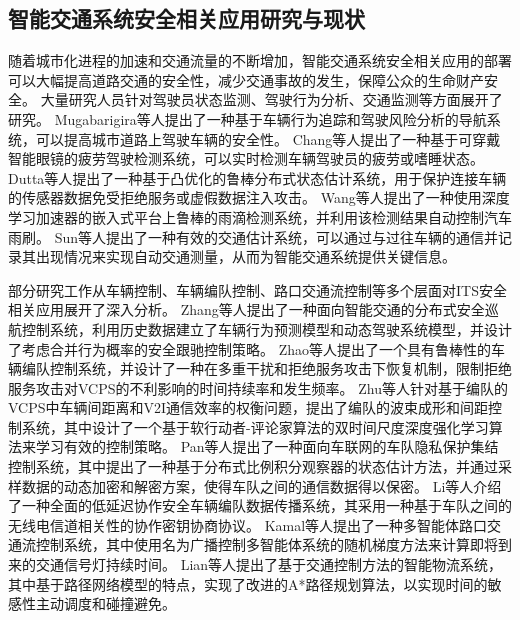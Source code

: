 \subsection{智能交通系统安全相关应用研究与现状}

随着城市化进程的加速和交通流量的不断增加，智能交通系统安全相关应用的部署可以大幅提高道路交通的安全性，减少交通事故的发生，保障公众的生命财产安全。
大量研究人员针对驾驶员状态监测、驾驶行为分析、交通监测等方面展开了研究。
Mugabarigira等人\cite{mugabarigira2023context}提出了一种基于车辆行为追踪和驾驶风险分析的导航系统，可以提高城市道路上驾驶车辆的安全性。
Chang等人\cite{chang2018design}提出了一种基于可穿戴智能眼镜的疲劳驾驶检测系统，可以实时检测车辆驾驶员的疲劳或嗜睡状态。
Dutta等人\cite{dutta2022design}提出了一种基于凸优化的鲁棒分布式状态估计系统，用于保护连接车辆的传感器数据免受拒绝服务或虚假数据注入攻击。
Wang等人\cite{wang2021deep}提出了一种使用深度学习加速器的嵌入式平台上鲁棒的雨滴检测系统，并利用该检测结果自动控制汽车雨刷。
Sun等人\cite{sun2022toward}提出了一种有效的交通估计系统，可以通过与过往车辆的通信并记录其出现情况来实现自动交通测量，从而为智能交通系统提供关键信息。

部分研究工作从车辆控制、车辆编队控制、路口交通流控制等多个层面对ITS安全相关应用展开了深入分析。
Zhang等人\cite{zhang2021data}提出了一种面向智能交通的分布式安全巡航控制系统，利用历史数据建立了车辆行为预测模型和动态驾驶系统模型，并设计了考虑合并行为概率的安全跟驰控制策略。
Zhao等人\cite{zhao2022resilient}提出了一个具有鲁棒性的车辆编队控制系统，并设计了一种在多重干扰和拒绝服务攻击下恢复机制，限制拒绝服务攻击对VCPS的不利影响的时间持续率和发生频率。
Zhu等人\cite{zhu2022joint}针对基于编队的VCPS中车辆间距离和V2I通信效率的权衡问题，提出了编队的波束成形和间距控制系统，其中设计了一个基于软行动者-评论家算法的双时间尺度深度强化学习算法来学习有效的控制策略。
Pan等人\cite{pan2023privacy}提出了一种面向车联网的车队隐私保护集结控制系统，其中提出了一种基于分布式比例积分观察器的状态估计方法，并通过采样数据的动态加密和解密方案，使得车队之间的通信数据得以保密。
Li等人\cite{li2021confidenitality}介绍了一种全面的低延迟协作安全车辆编队数据传播系统，其采用一种基于车队之间的无线电信道相关性的协作密钥协商协议。
Kamal等人\cite{kamal2021control}提出了一种多智能体路口交通流控制系统，其中使用名为广播控制多智能体系统的随机梯度方法来计算即将到来的交通信号灯持续时间。
Lian等人\cite{lian2021cyber}提出了基于交通控制方法的智能物流系统，其中基于路径网络模型的特点，实现了改进的A*路径规划算法，以实现时间的敏感性主动调度和碰撞避免。

